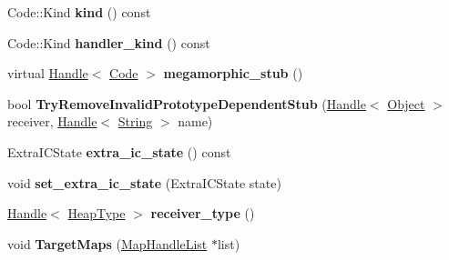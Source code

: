 \begin{DoxyCompactItemize}
\item 
\hypertarget{classv8_1_1internal_1_1_i_c_a53f7505b671156c1476725e8dc23e52a}{}Code\+::\+Kind {\bfseries kind} () const \label{classv8_1_1internal_1_1_i_c_a53f7505b671156c1476725e8dc23e52a}

\item 
\hypertarget{classv8_1_1internal_1_1_i_c_aeadc6a13c8bbc057b78aa4a2c3785f11}{}Code\+::\+Kind {\bfseries handler\+\_\+kind} () const \label{classv8_1_1internal_1_1_i_c_aeadc6a13c8bbc057b78aa4a2c3785f11}

\item 
\hypertarget{classv8_1_1internal_1_1_i_c_af1ad59ca3ddfd2115f080660f9e7ce04}{}virtual \hyperlink{classv8_1_1internal_1_1_handle}{Handle}$<$ \hyperlink{classv8_1_1internal_1_1_code}{Code} $>$ {\bfseries megamorphic\+\_\+stub} ()\label{classv8_1_1internal_1_1_i_c_af1ad59ca3ddfd2115f080660f9e7ce04}

\item 
\hypertarget{classv8_1_1internal_1_1_i_c_aeace1472509feffc8556371588f87f54}{}bool {\bfseries Try\+Remove\+Invalid\+Prototype\+Dependent\+Stub} (\hyperlink{classv8_1_1internal_1_1_handle}{Handle}$<$ \hyperlink{classv8_1_1internal_1_1_object}{Object} $>$ receiver, \hyperlink{classv8_1_1internal_1_1_handle}{Handle}$<$ \hyperlink{classv8_1_1internal_1_1_string}{String} $>$ name)\label{classv8_1_1internal_1_1_i_c_aeace1472509feffc8556371588f87f54}

\item 
\hypertarget{classv8_1_1internal_1_1_i_c_abebfb31fdaaf7bb946d9d3e002ccff92}{}Extra\+I\+C\+State {\bfseries extra\+\_\+ic\+\_\+state} () const \label{classv8_1_1internal_1_1_i_c_abebfb31fdaaf7bb946d9d3e002ccff92}

\item 
\hypertarget{classv8_1_1internal_1_1_i_c_a694f8ce2088d03c779e4e6358f2d3e95}{}void {\bfseries set\+\_\+extra\+\_\+ic\+\_\+state} (Extra\+I\+C\+State state)\label{classv8_1_1internal_1_1_i_c_a694f8ce2088d03c779e4e6358f2d3e95}

\item 
\hypertarget{classv8_1_1internal_1_1_i_c_a2e06888c198560ae9e69024ef36369f7}{}\hyperlink{classv8_1_1internal_1_1_handle}{Handle}$<$ \hyperlink{classv8_1_1internal_1_1_type_impl}{Heap\+Type} $>$ {\bfseries receiver\+\_\+type} ()\label{classv8_1_1internal_1_1_i_c_a2e06888c198560ae9e69024ef36369f7}

\item 
\hypertarget{classv8_1_1internal_1_1_i_c_a8ffc8d679e15e85ee41a98c2e2b93965}{}void {\bfseries Target\+Maps} (\hyperlink{classv8_1_1internal_1_1_list}{Map\+Handle\+List} $\ast$list)\label{classv8_1_1internal_1_1_i_c_a8ffc8d679e15e85ee41a98c2e2b93965}


\end{DoxyCompactItemize}
